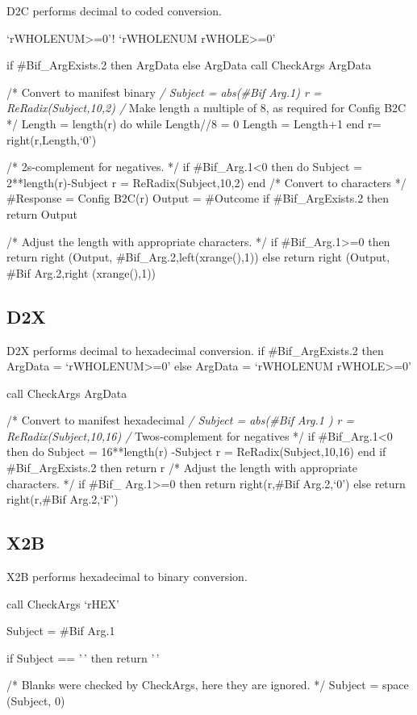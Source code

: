 D2C performs decimal to coded conversion.

`rWHOLENUM\textgreater=0'! `rWHOLENUM rWHOLE\textgreater=0'

if \#Bif\_ArgExists.2 then ArgData else ArgData call CheckArgs ArgData

/* Convert to manifest binary \emph{/ Subject = abs(\#Bif Arg.1) r =
ReRadix(Subject,10,2) /} Make length a multiple of 8, as required for
Config B2C */ Length = length(r) do while Length//8 = 0 Length =
Length+1 end r= right(r,Length,`0')

/* 2s-complement for negatives. */ if \#Bif\_Arg.1\textless0 then do
Subject = 2**length(r)-Subject r = ReRadix(Subject,10,2) end /* Convert
to characters */ \#Response = Config B2C(r) Output = \#Outcome if
\#Bif\_ArgExists.2 then return Output

/* Adjust the length with appropriate characters. */ if
\#Bif\_Arg.1\textgreater=0 then return right (Output,
\#Bif\_Arg.2,left(xrange(),1)) else return right (Output, \#Bif
Arg.2,right (xrange(),1))

\subsection{D2X}\label{d2x}

D2X performs decimal to hexadecimal conversion. if \#Bif\_ArgExists.2
then ArgData = `rWHOLENUM\textgreater=0' else ArgData = `rWHOLENUM
rWHOLE\textgreater=0'

call CheckArgs ArgData

/* Convert to manifest hexadecimal \emph{/ Subject = abs(\#Bif Arg.1 ) r
= ReRadix(Subject,10,16) /} Twos-complement for negatives */ if
\#Bif\_Arg.1\textless0 then do Subject = 16**length(r) -Subject r =
ReRadix(Subject,10,16) end if \#Bif\_ArgExists.2 then return r /* Adjust
the length with appropriate characters. */ if \#Bif\_
Arg.1\textgreater=0 then return right(r,\#Bif Arg.2,`0') else return
right(r,\#Bif Arg.2,`F')

\subsection{X2B}\label{x2b}

X2B performs hexadecimal to binary conversion.

call CheckArgs `rHEX'

Subject = \#Bif Arg.1

if Subject == '\,' then return '\,'

/* Blanks were checked by CheckArgs, here they are ignored. */ Subject =
space (Subject, 0)

